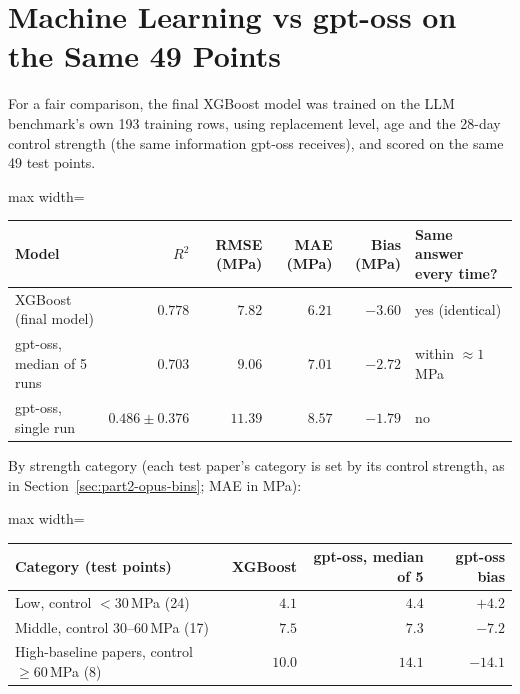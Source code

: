\documentclass[11pt]{article}
\newcommand{\R}{$R^2$}
\begin{document}
\section{Machine Learning vs gpt-oss on the Same 49 Points}
\label{sec:p3-direct}
For a fair comparison, the final XGBoost model was trained on the LLM benchmark's own 193
training rows, using replacement level, age and the 28-day control strength (the same
information gpt-oss receives), and scored on the same 49 test points.

\begin{center}\small
\begin{adjustbox}{max width=\linewidth}
\begin{tabular}{lrrrrl}
\toprule
Model & \R{} & RMSE (MPa) & MAE (MPa) & Bias (MPa) & Same answer every time? \\
\midrule
\rowcolor{green!12}XGBoost (final model) & $\mathbf{0.778}$ & $\mathbf{7.82}$ & $\mathbf{6.21}$ & $-3.60$ & yes (identical) \\
gpt-oss, median of 5 runs & $0.703$ & $9.06$ & $7.01$ & $-2.72$ & within $\approx1$\,MPa \\
gpt-oss, single run & $0.486\pm0.376$ & $11.39$ & $8.57$ & $-1.79$ & no \\
\bottomrule
\end{tabular}
\end{adjustbox}
\end{center}

\noindent By strength category (each test paper's category is set by its control
strength, as in Section~\ref{sec:part2-opus-bins}; MAE in MPa):

\begin{center}\small
\begin{adjustbox}{max width=\linewidth}
\begin{tabular}{lrrr}
\toprule
Category (test points) & XGBoost & gpt-oss, median of 5 & gpt-oss bias \\
\midrule
Low, control $<30$\,MPa (24) & $\mathbf{4.1}$ & $4.4$ & $+4.2$ \\
Middle, control $30$--$60$\,MPa (17) & $7.5$ & $\mathbf{7.3}$ & $-7.2$ \\
High-baseline papers, control $\geq60$\,MPa (8) & $\mathbf{10.0}$ & $14.1$ & $-14.1$ \\
\bottomrule
\end{tabular}
\end{adjustbox}
\end{center}
\end{document}
